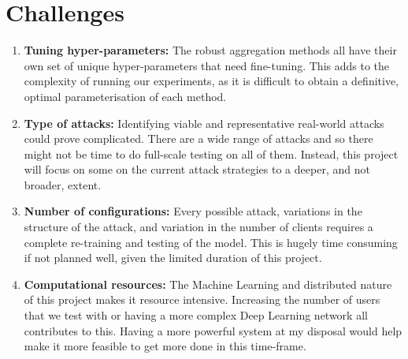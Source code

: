 \section{Challenges}
\begin{enumerate}
    \item \textbf{Tuning hyper-parameters:} 
    The robust aggregation methods all have their own set of unique hyper-parameters that need fine-tuning. This adds to the complexity of running our experiments, as it is difficult to obtain a definitive, optimal parameterisation of each method.
        
    \item \textbf{Type of attacks:} 
    Identifying viable and representative real-world attacks could prove complicated. 
    There are a wide range of attacks and so there might not be time to do full-scale testing on all of them.
    Instead, this project will focus on some on the current attack strategies to a deeper, and not broader, extent.

    \item \textbf{Number of configurations:}  
    Every possible attack, variations in the structure of the attack, and variation in the number of clients requires a complete re-training and testing of the model. 
    This is hugely time consuming if not planned well, given the limited duration of this project.
    
    \item \textbf{Computational resources:}
    The Machine Learning and distributed nature of this project makes it resource intensive. 
    Increasing the number of users that we test with or having a more complex Deep Learning network all contributes to this.
    Having a more powerful system at my disposal would help make it more feasible to get more done in this time-frame.
\end{enumerate}